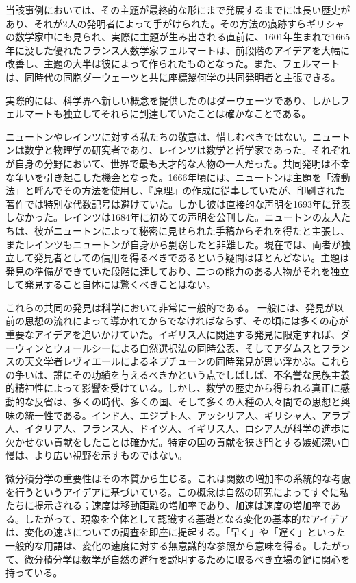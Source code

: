 \documentclass[a4paper,11pt,openany]{ltjsbook}
\begin{document}
当該事例においては、その主題が最終的な形にまで発展するまでには長い歴史があり、それが2人の発明者によって手がけられた。その方法の痕跡すらギリシャの数学家中にも見られ、実際に主題が生み出される直前に、1601年生まれで1665年に没した優れたフランス人数学家フェルマートは、前段階のアイデアを大幅に改善し、主題の大半は彼によって作られたものとなった。また、フェルマートは、同時代の同胞ダーウェーツと共に座標幾何学の共同発明者と主張できる。

実際的には、科学界へ新しい概念を提供したのはダーウェーツであり、しかしフェルマートも独立してそれらに到達していたことは確かなことである。

ニュートンやレインツに対する私たちの敬意は、惜しむべきではない。ニュートンは数学と物理学の研究者であり、レインツは数学と哲学家であった。それぞれが自身の分野において、世界で最も天才的な人物の一人だった。共同発明は不幸な争いを引き起こした機会となった。1666年頃には、ニュートンは主題を「流動法」と呼んでその方法を使用し、『原理』の作成に従事していたが、印刷された著作では特別な代数記号は避けていた。しかし彼は直接的な声明を1693年に発表しなかった。レインツは1684年に初めての声明を公刊した。ニュートンの友人たちは、彼がニュートンによって秘密に見せられた手稿からそれを得たと主張し、またレインツもニュートンが自身から剽窃したと非難した。現在では、両者が独立して発見者としての信用を得るべきであるという疑問はほとんどない。主題は発見の準備ができていた段階に達しており、二つの能力のある人物がそれを独立して発見すること自体には驚くべきことはない。

これらの共同の発見は科学において非常に一般的である。
一般には、発見が以前の思想の流れによって導かれてからでなければならず、その頃には多くの心が重要なアイデアを追いかけていた。イギリス人に関連する発見に限定すれば、ダーウィンとウォールシーによる自然選択法の同時公表、そしてアダムスとフランスの天文学者レヴィエールによるネプチューンの同時発見が思い浮かぶ。これらの争いは、誰にその功績を与えるべきかという点でしばしば、不名誉な民族主義的精神性によって影響を受けている。しかし、数学の歴史から得られる真正に感動的な反省は、多くの時代、多くの国、そして多くの人種の人々間での思想と興味の統一性である。インド人、エジプト人、アッシリア人、ギリシャ人、アラブ人、イタリア人、フランス人、ドイツ人、イギリス人、ロシア人が科学の進歩に欠かせない貢献をしたことは確かだ。特定の国の貢献を狭き門とする嫉妬深い自慢は、より広い視野を示すものではない。

微分積分学の重要性はその本質から生じる。これは関数の増加率の系統的な考慮を行うというアイデアに基づいている。この概念は自然の研究によってすぐに私たちに提示される；速度は移動距離の増加率であり、加速は速度の増加率である。したがって、現象を全体として認識する基礎となる変化の基本的なアイデアは、変化の速さについての調査を即座に提起する。「早く」や「遅く」といった一般的な用語は、変化の速度に対する無意識的な参照から意味を得る。したがって、微分積分学は数学が自然の進行を説明するために取るべき立場の鍵に関心を持っている。
\end{document}
